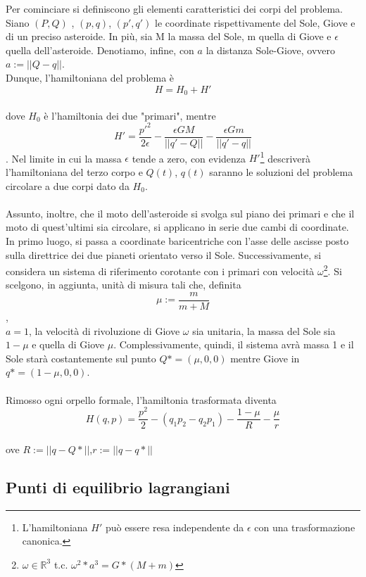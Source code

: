 Per cominciare si definiscono gli elementi caratteristici dei corpi del problema.\\
Siano $(P,Q)$ , $(p,q)$, $(p',q')$ le coordinate rispettivamente del Sole, Giove e di un preciso asteroide. In più, sia M la massa del Sole, m quella di Giove e $\epsilon$ quella dell'asteroide. Denotiamo, infine, con $a$ la distanza Sole-Giove, ovvero $a:=||Q-q||$.
\\Dunque, l'hamiltoniana del problema è $$ H = H_0 + H' $$ \\dove $H_0$ è l'hamiltonia dei due "primari", mentre 
$$H' = \frac{{p'}^2}{2 \epsilon} - \frac{\epsilon G M}{||q' - Q||} - \frac{\epsilon G m}{||q' - q||} $$.
Nel limite in cui la massa $\epsilon$ tende a zero, con evidenza $H'$\footnote {L'hamiltoniana $H'$ può essere resa independente da $\epsilon$ con una trasformazione canonica.} descriverà l'hamiltoniana del terzo corpo e $Q(t)$, $q(t)$ saranno le soluzioni del problema circolare a due corpi dato da $H_0$.
\\\\Assunto, inoltre, che il moto dell'asteroide si svolga sul piano dei primari e che il moto di quest'ultimi sia circolare, si applicano in serie due cambi di coordinate. 
In primo luogo, si passa a coordinate baricentriche con l'asse delle ascisse posto sulla direttrice dei due pianeti orientato verso il Sole. Successivamente, si considera un sistema di riferimento corotante con i primari con velocità $\omega$\footnote{$\omega \in \mathbb{R}^3$ t.c. $\omega^2*a^3 = G*(M+m)$}. 
Si scelgono, in aggiunta, unità di misura tali che, definita $$\mu := \frac{m}{m+M}  $$, \\$a=1$, la velocità di rivoluzione di Giove $\omega$ sia unitaria, la massa del Sole sia $ 1-\mu $ e quella di Giove $ \mu $. Complessivamente, quindi, il sistema avrà massa 1 e il Sole starà costantemente sul punto $ Q*= (\mu,0,0)$ mentre Giove in $q*= (1-\mu,0,0)$.
\\\\Rimosso ogni orpello formale, l'hamiltonia trasformata diventa \begin{equation}
\label{hamiltonianaRTBP}
H(q,p)= \frac{p^2}{2} -(q_1p_2 - q_2p_1) - \frac{1-\mu}{R} - \frac{\mu}{r}
\end{equation}
\\ove $R:=||q-Q*||$,$r:=||q-q*||$

\subsection {Punti di equilibrio lagrangiani}

